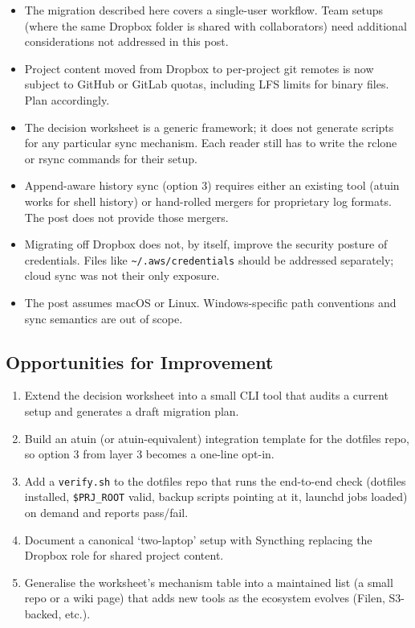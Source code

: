 \documentclass[
  11pt,
  letterpaper,
  DIV=11,
  numbers=noendperiod]{scrartcl}
\providecommand{\tightlist}{%
  \setlength{\itemsep}{0pt}\setlength{\parskip}{0pt}}\usepackage{longtable,booktabs,array}
\begin{document}
\begin{itemize}
\tightlist
\item
  The migration described here covers a single-user workflow. Team
  setups (where the same Dropbox folder is shared with collaborators)
  need additional considerations not addressed in this post.
\item
  Project content moved from Dropbox to per-project git remotes is now
  subject to GitHub or GitLab quotas, including LFS limits for binary
  files. Plan accordingly.
\item
  The decision worksheet is a generic framework; it does not generate
  scripts for any particular sync mechanism. Each reader still has to
  write the rclone or rsync commands for their setup.
\item
  Append-aware history sync (option 3) requires either an existing tool
  (atuin works for shell history) or hand-rolled mergers for proprietary
  log formats. The post does not provide those mergers.
\item
  Migrating off Dropbox does not, by itself, improve the security
  posture of credentials. Files like
  \texttt{\textasciitilde{}/.aws/credentials} should be addressed
  separately; cloud sync was not their only exposure.
\item
  The post assumes macOS or Linux. Windows-specific path conventions and
  sync semantics are out of scope.
\end{itemize}

\subsection{Opportunities for
Improvement}\label{opportunities-for-improvement}

\begin{enumerate}
\def\labelenumi{\arabic{enumi}.}
\tightlist
\item
  Extend the decision worksheet into a small CLI tool that audits a
  current setup and generates a draft migration plan.
\item
  Build an atuin (or atuin-equivalent) integration template for the
  dotfiles repo, so option 3 from layer 3 becomes a one-line opt-in.
\item
  Add a \texttt{verify.sh} to the dotfiles repo that runs the end-to-end
  check (dotfiles installed, \texttt{\$PRJ\_ROOT} valid, backup scripts
  pointing at it, launchd jobs loaded) on demand and reports pass/fail.
\item
  Document a canonical `two-laptop' setup with Syncthing replacing the
  Dropbox role for shared project content.
\item
  Generalise the worksheet's mechanism table into a maintained list (a
  small repo or a wiki page) that adds new tools as the ecosystem
  evolves (Filen, S3-backed, etc.).
\end{enumerate}
\end{document}
